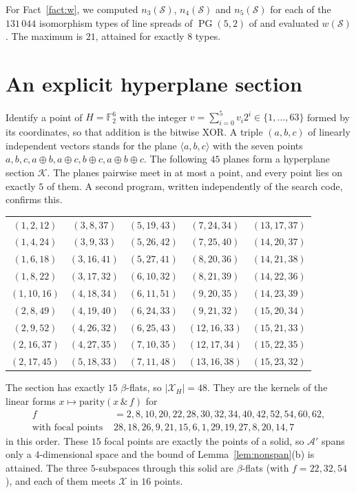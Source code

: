 \documentclass[11pt]{amsart}
\theoremstyle{definition}
\newcommand{\F}{\mathbb{F}}
\newcommand{\K}{\mathcal{K}}
\newcommand{\X}{\mathcal{X}}
\newcommand{\A}{\mathcal{A}}
\newcommand{\PG}{\operatorname{PG}}
\begin{document}
For Fact~\ref{fact:w}, we computed $n_3(\mathcal S)$, $n_4(\mathcal S)$ and $n_5(\mathcal S)$ for each of the $131\,044$ isomorphism types of line spreads of $\PG(5,2)$ of \cite{MT09} and evaluated $w(\mathcal S)$. The maximum is $21$, attained for exactly $8$ types.

\section{An explicit hyperplane section}\label{app:section}
Identify a point of $H=\F_2^6$ with the integer $v=\sum_{i=0}^5v_i2^i\in\{1,\dots,63\}$ formed by its coordinates, so that addition is the bitwise XOR. A triple $(a,b,c)$ of linearly independent vectors stands for the plane $\langle a,b,c\rangle$ with the seven points $a,b,c,a\oplus b,a\oplus c,b\oplus c,a\oplus b\oplus c$. The following $45$ planes form a hyperplane section $\K$. The planes pairwise meet in at most a point, and every point lies on exactly $5$ of them. A second program, written independently of the search code, confirms this.
\begin{center}\small
\setlength{\tabcolsep}{6pt}
\begin{tabular}{@{}ccccc@{}}
$(1,2,12)$ & $(3,8,37)$ & $(5,19,43)$ & $(7,24,34)$ & $(13,17,37)$\\
$(1,4,24)$ & $(3,9,33)$ & $(5,26,42)$ & $(7,25,40)$ & $(14,20,37)$\\
$(1,6,18)$ & $(3,16,41)$ & $(5,27,41)$ & $(8,20,36)$ & $(14,21,38)$\\
$(1,8,22)$ & $(3,17,32)$ & $(6,10,32)$ & $(8,21,39)$ & $(14,22,36)$\\
$(1,10,16)$ & $(4,18,34)$ & $(6,11,51)$ & $(9,20,35)$ & $(14,23,39)$\\
$(2,8,49)$ & $(4,19,40)$ & $(6,24,33)$ & $(9,21,32)$ & $(15,20,34)$\\
$(2,9,52)$ & $(4,26,32)$ & $(6,25,43)$ & $(12,16,33)$ & $(15,21,33)$\\
$(2,16,37)$ & $(4,27,35)$ & $(7,10,35)$ & $(12,17,34)$ & $(15,22,35)$\\
$(2,17,45)$ & $(5,18,33)$ & $(7,11,48)$ & $(13,16,38)$ & $(15,23,32)$\\
\end{tabular}
\end{center}
The section has exactly $15$ $\beta$-flats, so $|\X_H|=48$. They are the kernels of the linear forms $x\mapsto\mathrm{parity}(x\,\&\,f)$ for
\begin{align*}
f&=2,8,10,20,22,28,30,32,34,40,42,52,54,60,62,\\
\text{with focal points }&28,18,26,9,21,15,6,1,29,19,27,8,20,14,7
\end{align*}
in this order. These $15$ focal points are exactly the points of a solid, so $\A'$ spans only a $4$-dimensional space and the bound of Lemma~\ref{lem:nonspan}(b) is attained. The three $5$-subspaces through this solid are $\beta$-flats (with $f=22,32,54$), and each of them meets $\X$ in $16$ points.
\end{document}
